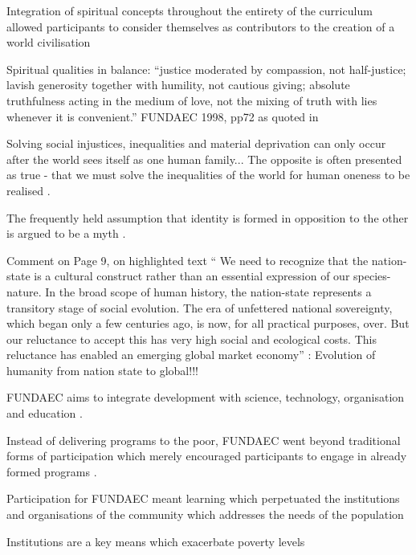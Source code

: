 Integration of spiritual concepts throughout the entirety of the curriculum allowed participants to consider themselves as contributors to the creation of a world civilisation \citep{Arbab2000}

Spiritual qualities in balance: “justice moderated by compassion, not half-justice; lavish generosity together with humility, not cautious giving; absolute truthfulness acting in the medium of love, not the mixing of truth with lies whenever it is convenient.” FUNDAEC 1998, pp72 as quoted in \cite{Arbab2000}




Solving social injustices, inequalities and material deprivation can only occur after the world sees itself as one human family... The opposite is often presented as true - that we must solve the inequalities of the world for human oneness to be realised \citep{Karlberg2008}. %

The frequently held assumption that identity is formed in opposition to the other is argued  to be a myth \citep{Karlberg2008}.

Comment on Page 9, on highlighted text “ We need to recognize that the nation-state is a cultural construct rather than an essential expression of our species-nature. In the broad scope of human history, the nation-state represents a transitory stage of social evolution. The era of unfettered national sovereignty, which began only a few centuries ago, is now, for all practical purposes, over. But our reluctance to accept this has very high social and ecological costs. This reluctance has enabled an emerging global market economy” : Evolution of humanity from nation state to global!!!  \citep{Karlberg2008}








FUNDAEC aims to integrate development with science, technology, organisation and education \citep{Arbab1988}.

Instead of delivering programs to the poor, FUNDAEC went beyond traditional forms of participation which merely encouraged participants to engage in already formed programs \citep{Arbab1988}.

Participation for FUNDAEC meant learning which perpetuated the institutions and organisations of the community which addresses the needs of the population \citep{Arbab1988}

Institutions are a key means which exacerbate poverty levels \citep{Arbab1988}

